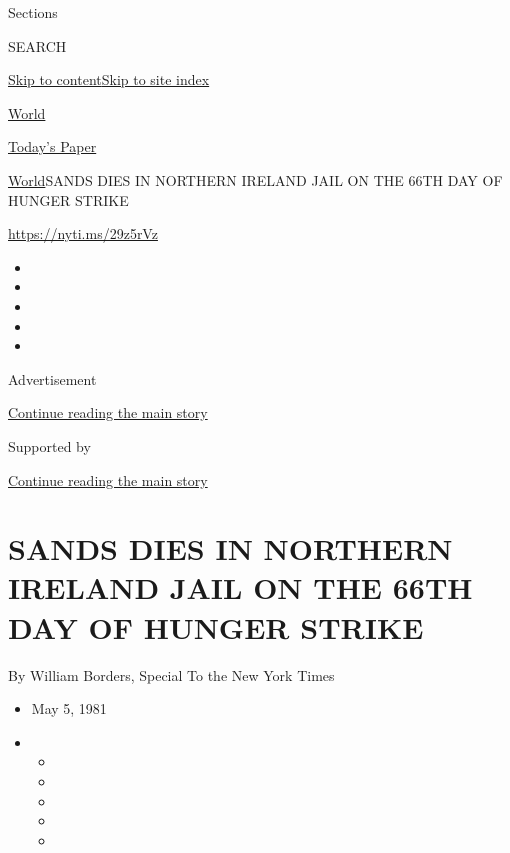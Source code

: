 Sections

SEARCH

\protect\hyperlink{site-content}{Skip to
content}\protect\hyperlink{site-index}{Skip to site index}

\href{https://www.nytimes.com/section/world}{World}

\href{https://myaccount.nytimes.com/auth/login?response_type=cookie\&client_id=vi}{}

\href{https://www.nytimes.com/section/todayspaper}{Today's Paper}

\href{/section/world}{World}\textbar{}SANDS DIES IN NORTHERN IRELAND
JAIL ON THE 66TH DAY OF HUNGER STRIKE

\url{https://nyti.ms/29z5rVz}

\begin{itemize}
\item
\item
\item
\item
\item
\end{itemize}

Advertisement

\protect\hyperlink{after-top}{Continue reading the main story}

Supported by

\protect\hyperlink{after-sponsor}{Continue reading the main story}

\hypertarget{sands-dies-in-northern-ireland-jail-on-the-66th-day-of-hunger-strike}{%
\section{SANDS DIES IN NORTHERN IRELAND JAIL ON THE 66TH DAY OF HUNGER
STRIKE}\label{sands-dies-in-northern-ireland-jail-on-the-66th-day-of-hunger-strike}}

By William Borders, Special To the New York Times

\begin{itemize}
\item
  May 5, 1981
\item
  \begin{itemize}
  \item
  \item
  \item
  \item
  \item
  \end{itemize}
\end{itemize}

